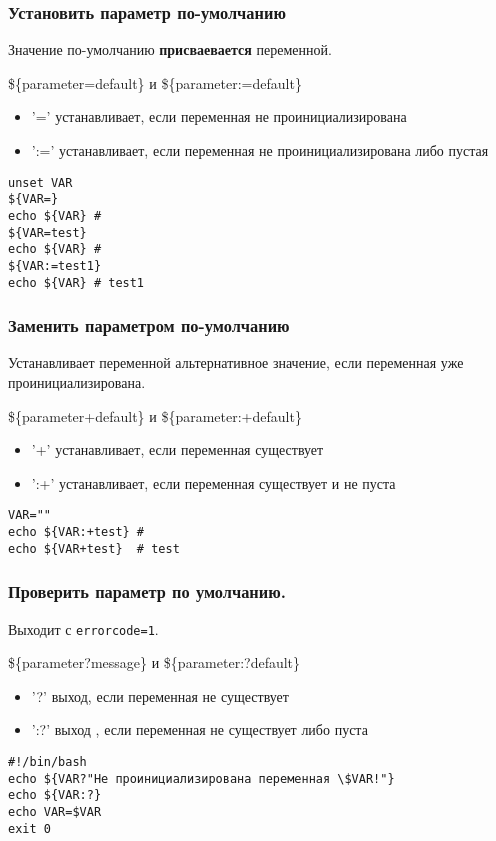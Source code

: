 \begin{frame}[fragile]
	\frametitle{Установить параметр по-умолчанию}

	Значение по-умолчанию {\bf присваевается} переменной. 

	\begin{block}{\$\{parameter=default\} и \$\{parameter:=default\}}
	\begin{itemize}
		\item '=' устанавливает, если переменная не проинициализирована
		\item ':=' устанавливает, если переменная не проинициализирована либо пустая
	\end{itemize}
	\begin{lstlisting}
unset VAR
${VAR=}
echo ${VAR} # 
${VAR=test}
echo ${VAR} # 
${VAR:=test1}
echo ${VAR} # test1
\end{lstlisting}
	\end{block}

\end{frame}

\begin{frame}[fragile]
	\frametitle{Заменить параметром по-умолчанию}

	Устанавливает переменной альтернативное значение, если переменная уже проинициализирована.

	\begin{block}{\$\{parameter+default\} и \$\{parameter:+default\}}
	\begin{itemize}
		\item '+' устанавливает, если переменная существует
		\item ':+' устанавливает, если переменная существует и не пуста
	\end{itemize}
	\begin{lstlisting}
VAR=""
echo ${VAR:+test} # 
echo ${VAR+test}  # test
\end{lstlisting}
	\end{block}

\end{frame}


\begin{frame}[fragile]
	\frametitle{Проверить параметр по умолчанию.}

	Выходит с {\tt errorcode=1}.

	\begin{block}{\$\{parameter?message\} и \$\{parameter:?default\}}
	\begin{itemize}
		\item '?' выход, если переменная не существует
		\item ':?' выход , если переменная не существует либо пуста
	\end{itemize}

	\begin{lstlisting}
#!/bin/bash
echo ${VAR?"Не проинициализирована переменная \$VAR!"}
echo ${VAR:?}
echo VAR=$VAR
exit 0
\end{lstlisting}
	\end{block}
\end{frame}

